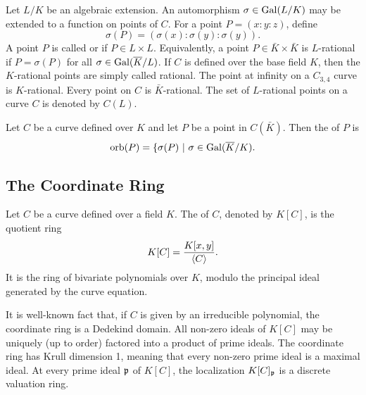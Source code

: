 Let $L/K$ be an algebraic extension.
An automorphism $\sigma \in \operatorname{Gal}(L/K)$ may be extended to a function on points of $C$.
For a point $P = (x : y : z)$, define
\[ \sigma(P) = (\sigma(x) : \sigma(y) : \sigma(y)). \]
A point $P$ is called  or  if $P \in L \times L$.
Equivalently, a point $P \in \bar K \times \bar K$ is $L$-rational if $P = \sigma(P)$ for all $\sigma \in \operatorname{Gal}(\overline K/L)$.
If $C$ is defined over the base field $K$, then the $K$-rational points are simply called rational.
The point at infinity on a $C_{3,4}$ curve is $K$-rational.
Every point on $C$ is $\bar K$-rational.
The set of $L$-rational points on a curve $C$ is denoted by $C(L)$.

Let $C$ be a curve defined over $K$ and let $P$ be a point in $C(\bar K)$.
Then the  of $P$ is
\[ \operatorname{orb}(P) = \{ \sigma(P) ~|~ \sigma \in \operatorname{Gal}(\overline K/K). \]



\subsection{The Coordinate Ring}

Let $C$ be a curve defined over a field $K$.
The  of $C$, denoted by $K[C]$, is the quotient ring
\[ K[C] = \frac {K[x,y]} {\left\langle C \right\rangle}. \]
It is the ring of bivariate polynomials over $K$, modulo the principal ideal generated by the curve equation.

It is well-known fact that, if $C$ is given by an irreducible polynomial, the coordinate ring is a Dedekind domain.
All non-zero ideals of $K[C]$ may be uniquely (up to order) factored into a product of prime ideals.
The coordinate ring has Krull dimension 1, meaning that every non-zero prime ideal is a maximal ideal.
At every prime ideal $\frak p$ of $K[C]$, the localization $K[C]_{\frak p}$ is a discrete valuation ring.

